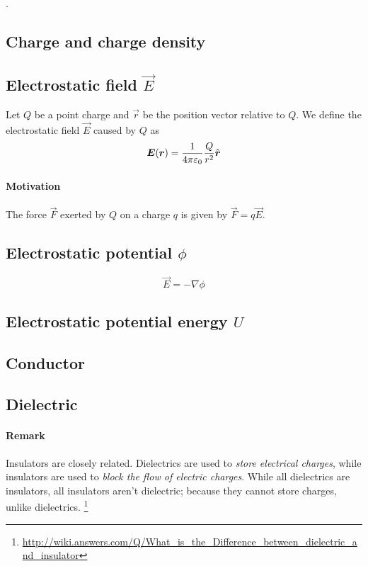 .

\subsection{Charge and charge density}
\label{charge}\label{charge density}

\subsection{Electrostatic field $\vec{E}$}
\label{def:electric field}

Let $Q$ be a point charge and $\vec{r}$ be the position vector
relative to $Q$. We define the electrostatic field $\vec{E}$ caused by
$Q$ as
\begin{equation*}
  \boldsymbol{E}(\boldsymbol{r}) = \frac{1}{4\pi\varepsilon_0}\frac{Q}{r^2}\hat{\boldsymbol{r}}
\end{equation*}

\paragraph{Motivation} The force $\vec{F}$ exerted by $Q$ on a charge $q$ is
given by $\vec{F} = q\vec{E}$.

\subsection{Electrostatic potential $\phi$}
\label{def:electric potential}
\begin{equation*}
  \vec{E} = - \nabla\phi
\end{equation*}

\subsection{Electrostatic potential energy $U$}

\subsection{Conductor}
\label{def:conductor}

\subsection{Dielectric}
\label{def:dielectric}

\paragraph{Remark} Insulators are closely related. Dielectrics are
used to \emph{store electrical charges}, while insulators are used to
\emph{block the flow of electric charges}. While all dielectrics are
insulators, all insulators aren't dielectric; because they cannot
store charges, unlike dielectrics.
\footnote{\url{http://wiki.answers.com/Q/What_is_the_Difference_between_dielectric_and_insulator}}

